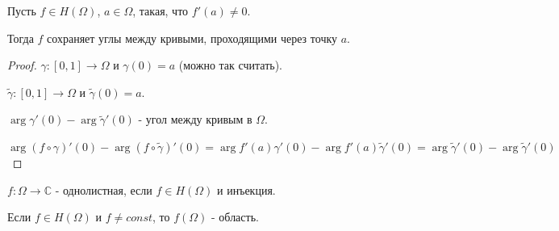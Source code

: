 \begin{theorem}
    Пусть $f \in H(\Omega)$, $a \in \Omega$, такая, что $f'(a) \neq 0$.
    
    Тогда $f$ сохраняет углы между кривыми, проходящими через точку $a$.  
\end{theorem}

\begin{proof}
    $\gamma : [0, 1] \to \Omega$ и $\gamma (0) = a$ (можно так считать).
    
    $\tilde{\gamma} : [0, 1] \to \Omega$ и $\tilde{\gamma} (0) = a$.

    $\arg \gamma'(0) - \arg \tilde{\gamma}'(0)$ - угол между кривым в $\Omega$.

    $\arg (f \circ \gamma)'(0) - \arg (f \circ \tilde{\gamma})'(0) = \arg f'(a)\gamma'(0) - \arg f'(a) \tilde{\gamma}'(0) = 
    \arg \tilde{\gamma}'(0) - \arg \tilde{\gamma}'(0)$
\end{proof}

\begin{definition}
    $f : \Omega \to \mathbb{C}$ - однолистная, если $f \in H(\Omega)$ и 
    инъекция.
\end{definition}

\begin{theorem}
    Если $f \in H(\Omega)$ и $f \neq const$, то $f(\Omega)$ - область.
\end{theorem}


